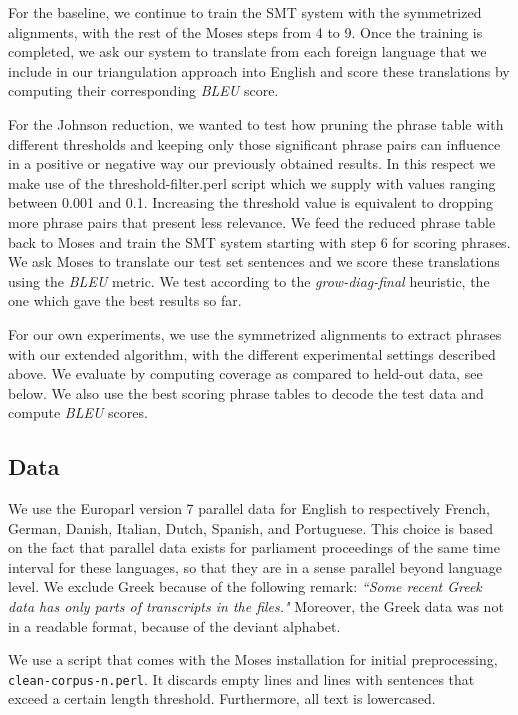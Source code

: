 \documentclass[11pt]{article}
\begin{document}
For the baseline, we continue to train the SMT system with the symmetrized alignments, with the rest of the Moses steps from 4 to 9. Once the training is completed, we ask our system to translate from each foreign language that we include in our triangulation approach into English and score these translations by computing their corresponding \textit{BLEU} score. 

For the Johnson reduction, we wanted to test how pruning the phrase table with different thresholds and keeping only those significant phrase pairs can influence in a positive or negative way our previously obtained results. In this respect we make use of the threshold-filter.perl script which we supply with values ranging between 0.001 and 0.1. Increasing the threshold value is equivalent to dropping more phrase pairs that present less relevance. We feed the reduced phrase table back to Moses and train the SMT system starting with step 6 for scoring phrases. We ask Moses to translate our test set sentences and we score these translations using the \textit{BLEU} metric.  We test according to the \textit{grow-diag-final} heuristic, the one which gave the best results so far.

For our own experiments, we use the symmetrized alignments to extract phrases with our extended algorithm, with the different experimental settings described above. We evaluate by computing coverage as compared to held-out data, see below. We also use the best scoring phrase tables to decode the test data and compute \textit{BLEU} scores.


\subsection{Data}

We use the Europarl version 7 parallel data for English to respectively French, German, Danish, Italian, Dutch, Spanish, and Portuguese. This choice is based on the fact that parallel data exists for parliament proceedings of the same time interval for these languages, so that they are in a sense parallel beyond language level.
We exclude Greek because of the following remark: \textit{``Some recent Greek data has only parts of transcripts in the files."} Moreover, the Greek data was not in a readable format, because of the deviant alphabet.

We use a script that comes with the Moses installation for initial preprocessing, {\tt clean-corpus-n.perl}. It discards empty lines and lines with sentences that exceed a certain length threshold. Furthermore, all text is lowercased.
\end{document}
